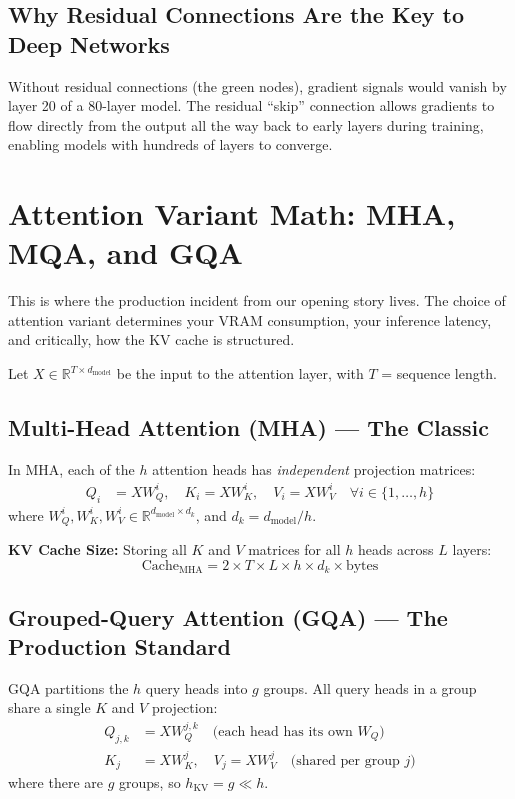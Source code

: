 \subsection{Why Residual Connections Are the Key to Deep Networks}
Without residual connections (the green nodes), gradient signals would vanish by layer 20 of a 80-layer model. The residual ``skip'' connection allows gradients to flow directly from the output all the way back to early layers during training, enabling models with hundreds of layers to converge.

\section{Attention Variant Math: MHA, MQA, and GQA}

This is where the production incident from our opening story lives. The choice of attention variant determines your VRAM consumption, your inference latency, and critically, how the KV cache is structured.

Let $X \in \mathbb{R}^{T \times d_{\text{model}}}$ be the input to the attention layer, with $T$ = sequence length.

\subsection{Multi-Head Attention (MHA) — The Classic}
In MHA, each of the $h$ attention heads has \textit{independent} projection matrices:
\begin{align}
Q_i &= X W_Q^i, \quad K_i = X W_K^i, \quad V_i = X W_V^i \quad \forall i \in \{1,\dots,h\}
\end{align}
where $W_Q^i, W_K^i, W_V^i \in \mathbb{R}^{d_{\text{model}} \times d_k}$, and $d_k = d_{\text{model}} / h$.

\textbf{KV Cache Size:} Storing all $K$ and $V$ matrices for all $h$ heads across $L$ layers:
\begin{equation}
\text{Cache}_{\text{MHA}} = 2 \times T \times L \times h \times d_k \times \text{bytes}
\end{equation}

\subsection{Grouped-Query Attention (GQA) — The Production Standard}
GQA partitions the $h$ query heads into $g$ groups. All query heads in a group share a single $K$ and $V$ projection:
\begin{align}
Q_{j,k} &= X W_Q^{j,k} \quad \text{(each head has its own } W_Q\text{)}\\
K_j &= X W_K^j, \quad V_j = X W_V^j \quad \text{(shared per group } j\text{)}
\end{align}
where there are $g$ groups, so $h_{\text{KV}} = g \ll h$.

